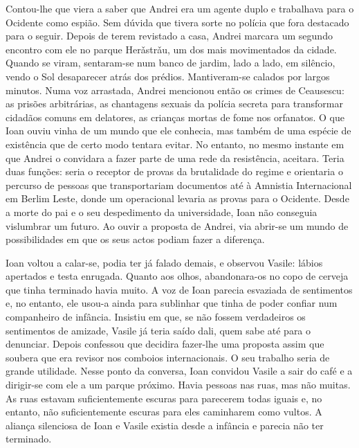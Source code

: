 Contou-lhe que viera a saber que Andrei era um agente duplo e trabalhava
para o Ocidente como espião. Sem dúvida que tivera sorte no polícia que
fora destacado para o seguir. Depois de terem revistado a casa, Andrei
marcara um segundo encontro com ele no parque Herǎstrǎu, um dos mais
movimentados da cidade. Quando se viram, sentaram-se num banco de
jardim, lado a lado, em silêncio, vendo o Sol desaparecer atrás dos
prédios. Mantiveram-se calados por largos minutos. Numa voz arrastada,
Andrei mencionou então os crimes de Ceausescu: as prisões arbitrárias, as chantagens sexuais da polícia secreta para transformar
cidadãos comuns em delatores, as crianças mortas de fome nos orfanatos.
O que Ioan ouviu vinha de um mundo que ele conhecia, mas também de uma
espécie de existência que de certo modo tentara evitar. No entanto, no
mesmo instante em que Andrei o convidara a fazer parte de uma rede da
resistência, aceitara. Teria duas funções: seria o receptor de provas
da brutalidade do regime e orientaria o percurso de pessoas que
transportariam documentos até à Amnistia Internacional em Berlim Leste,
donde um operacional levaria as provas para o Ocidente. Desde a morte do
pai e o seu despedimento da universidade, Ioan não conseguia
vislumbrar um futuro. Ao ouvir a proposta de Andrei, via abrir-se um
mundo de possibilidades em que os seus actos podiam fazer a diferença.

Ioan voltou a calar-se, podia ter já falado demais, e
observou Vasile: lábios apertados e testa enrugada. Quanto aos olhos,
abandonara-os no copo de cerveja que tinha terminado havia muito. A voz
de Ioan parecia esvaziada de sentimentos e, no entanto, ele usou-a ainda
para sublinhar que tinha de poder confiar num companheiro de infância.
Insistiu em que, se não fossem verdadeiros os sentimentos de amizade,
Vasile já teria saído dali, quem sabe até para o denunciar. Depois
confessou que decidira fazer-lhe uma proposta assim que soubera que era
revisor nos comboios internacionais. O seu trabalho seria de grande
utilidade. Nesse ponto da conversa, Ioan convidou Vasile a sair do café
e a dirigir-se com ele a um parque próximo. Havia pessoas nas ruas, mas
não muitas. As ruas estavam suficientemente escuras para parecerem
todas iguais e, no entanto,
não suficientemente escuras para eles caminharem como vultos. A aliança
silenciosa de Ioan e Vasile existia desde a infância e parecia não ter
terminado.

